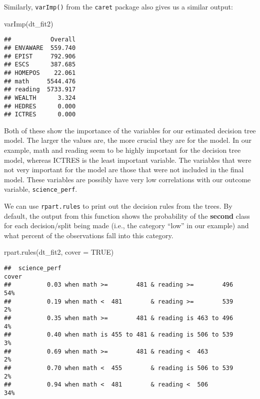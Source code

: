 \documentclass[
]{book}
\newenvironment{Shaded}{\begin{snugshade}}{\end{snugshade}}
\newcommand{\AttributeTok}[1]{\textcolor[rgb]{0.77,0.63,0.00}{#1}}
\newcommand{\ConstantTok}[1]{\textcolor[rgb]{0.00,0.00,0.00}{#1}}
\newcommand{\FunctionTok}[1]{\textcolor[rgb]{0.00,0.00,0.00}{#1}}
\newcommand{\NormalTok}[1]{#1}
\begin{document}
Similarly, \texttt{varImp()} from the \texttt{caret} package also gives us a similar output:

\begin{Shaded}
\begin{Highlighting}[]
\FunctionTok{varImp}\NormalTok{(dt\_fit2)}
\end{Highlighting}
\end{Shaded}

\begin{verbatim}
##           Overall
## ENVAWARE  559.740
## EPIST     792.906
## ESCS      387.685
## HOMEPOS    22.061
## math     5544.476
## reading  5733.917
## WEALTH      3.324
## HEDRES      0.000
## ICTRES      0.000
\end{verbatim}

Both of these show the importance of the variables for our estimated decision tree model. The larger the values are, the more crucial they are for the model. In our example, math and reading seem to be highly important for the decision tree model, whereas ICTRES is the least important variable. The variables that were not very important for the model are those that were not included in the final model. These variables are possibly have very low correlations with our outcome variable, \texttt{science\_perf}.

We can use \texttt{rpart.rules} to print out the decision rules from the trees. By default, the output from this function shows the probability of the \textbf{second} class for each decision/split being made (i.e., the category ``low'' in our example) and what percent of the observations fall into this category.

\begin{Shaded}
\begin{Highlighting}[]
\FunctionTok{rpart.rules}\NormalTok{(dt\_fit2, }\AttributeTok{cover =} \ConstantTok{TRUE}\NormalTok{)}
\end{Highlighting}
\end{Shaded}

\begin{verbatim}
##  science_perf                                                   cover
##          0.03 when math >=        481 & reading >=        496     54%
##          0.19 when math <  481        & reading >=        539      2%
##          0.35 when math >=        481 & reading is 463 to 496      4%
##          0.40 when math is 455 to 481 & reading is 506 to 539      3%
##          0.69 when math >=        481 & reading <  463             2%
##          0.70 when math <  455        & reading is 506 to 539      2%
##          0.94 when math <  481        & reading <  506            34%
\end{verbatim}
\end{document}
